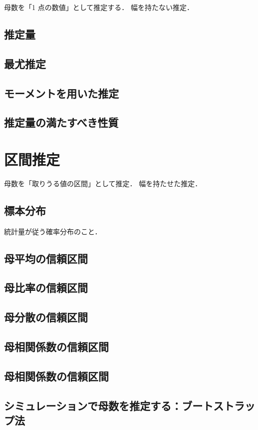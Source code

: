 母数を「1 点の数値」として推定する．
幅を持たない推定．

\subsection{推定量}
\subsection{最尤推定}
\subsection{モーメントを用いた推定}
\subsection{推定量の満たすべき性質}

\section{区間推定}

母数を「取りうる値の区間」として推定．
幅を持たせた推定．

\subsection{標本分布}

統計量が従う確率分布のこと．

\subsection{母平均の信頼区間}
\subsection{母比率の信頼区間}
\subsection{母分散の信頼区間}
\subsection{母相関係数の信頼区間}
\subsection{母相関係数の信頼区間}

\subsection{シミュレーションで母数を推定する：ブートストラップ法}
